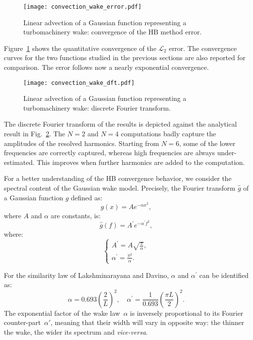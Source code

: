 \begin{figure}[htp]
  \centering
  \texttt{[image: convection\_wake\_error.pdf]}
  \caption{Linear advection of a Gaussian function representing a 
  turbomachinery wake: convergence of the HB method error.}
  \label{fig:conv_wake}
\end{figure}
Figure~\ref{fig:conv_wake} shows the quantitative convergence of 
the $\mathcal{L}_2$ error. The
convergence curves for the two functions studied in the previous sections
are also reported for comparison.
The error follows now a nearly exponential convergence.
\begin{figure}[htp]
  \centering
  \texttt{[image: convection\_wake\_dft.pdf]}
  \caption{Linear advection of a Gaussian function representing a turbomachinery wake: 
  discrete Fourier transform.}
  \label{fig:dft_wake}
\end{figure}
The discrete Fourier transform of the results is
depicted against the analytical result in Fig.~\ref{fig:dft_wake}.
The $N=2$ and $N=4$ computations badly capture the amplitudes of the
resolved harmonics.
Starting from $N=6$, some of the lower 
frequencies are correctly captured, whereas high frequencies are
always under-estimated.
This improves when further harmonics are added to the computation.

For a better understanding of the HB convergence behavior, 
we consider the spectral content of the Gaussian wake model. 
Precisely, the Fourier transform $\widehat{g}$ of a Gaussian function $g$
defined as:
\begin{equation}
    g(x) = A e^{-\alpha x^2},
    \label{eq:simple_gaussian_function}
\end{equation}
where $A$ and $\alpha$ are constants, is:
\begin{equation}
    \widehat{g}(f) = A^\prime e^{-\alpha^\prime f^2},
    \label{eq:fourier_transform_gaussian}
\end{equation}
where:
\begin{equation}
  \begin{cases}
    A^\prime=A \sqrt{\frac{\pi}{\alpha}},\\
    \alpha^\prime = \frac{\pi^2}{\alpha}.
  \end{cases}
\end{equation}

For the similarity law of Lakshminarayana and Davino, 
$\alpha$ and $\alpha^\prime$ can be identified as:
\begin{equation}
    \alpha =  0.693 \left( \frac{2}{L} \right)^2, \quad
    \alpha^\prime =  \frac{1}{0.693} \left( \frac{\pi L}{2} \right)^2.
    \label{eq:gaussian_params_laksh}
\end{equation}
The exponential factor of the wake law~$\alpha$ is inversely
proportional to its Fourier counter-part~$\alpha'$, meaning that their
width will vary in opposite way: the thinner the wake, the wider its
spectrum and \emph{vice-versa}.

